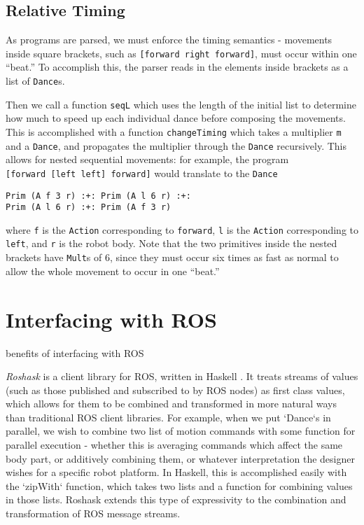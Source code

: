 \documentclass[sigconf]{acmart}
\begin{document}
\subsection{Relative Timing}\label{relative-timing}

As programs are parsed, we must enforce the timing semantics - movements
inside square brackets, such as \texttt{{[}forward\ right\ forward{]}},
must occur within one ``beat.'' To accomplish this, the parser reads in
the elements inside brackets as a list of \texttt{Dance}s.

Then we call a function \texttt{seqL} which uses the length of the
initial list to determine how much to speed up each individual dance
before composing the movements. This is accomplished with a function
\texttt{changeTiming} which takes a multiplier \texttt{m} and a
\texttt{Dance}, and propagates the multiplier through the \texttt{Dance}
recursively. This allows for nested sequential movements: for example,
the program \texttt{{[}forward\ {[}left\ left{]}\ forward{]}} would
translate to the \texttt{Dance}

\begin{verbatim}
Prim (A f 3 r) :+: Prim (A l 6 r) :+: 
Prim (A l 6 r) :+: Prim (A f 3 r)
\end{verbatim}

where \texttt{f} is the \texttt{Action} corresponding to
\texttt{forward}, \texttt{l} is the \texttt{Action} corresponding to
\texttt{left}, and \texttt{r} is the robot body. Note that the two
primitives inside the nested brackets have \texttt{Mult}s of 6, since
they must occur six times as fast as normal to allow the whole movement
to occur in one ``beat.''

\section{Interfacing with ROS}\label{interfacing-with-ros}



{\color{red}benefits of interfacing with ROS}


\emph{Roshask} is a client library for ROS, written in Haskell
\cite{cowley2011stream}. It treats streams of values (such as those published
and subscribed to by ROS nodes) as first class values, which allows for them to
be combined and transformed in more natural ways than traditional ROS client
libraries. For example, when we put `Dance`s in parallel, we wish to combine two
list of motion commands with some function for parallel execution - whether this
is averaging commands which affect the same body part, or additively combining
them, or whatever interpretation the designer wishes for a specific robot
platform. In Haskell, this is accomplished easily with the
`zipWith` function, which takes two lists and a function for combining values in
those lists. Roshask extends this type of expressivity to the combination and
transformation of ROS message streams.
\end{document}
